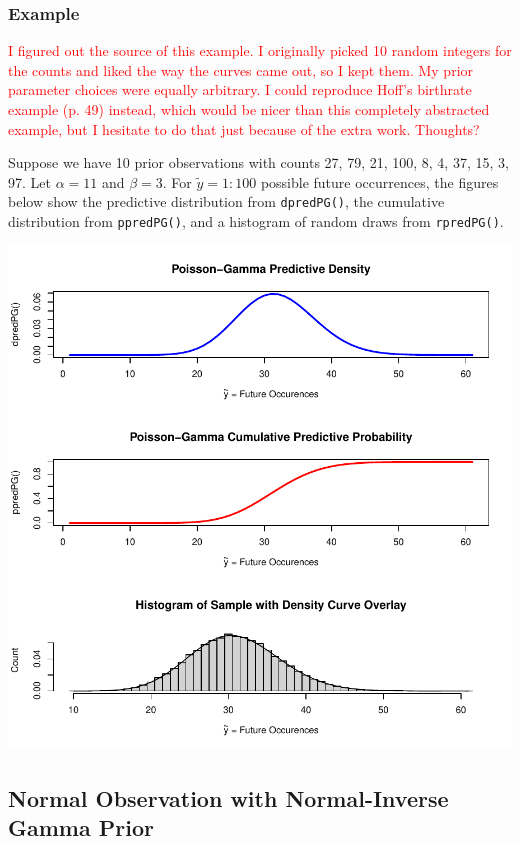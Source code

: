 \documentclass[12pt, a4paper]{article}
\begin{document}
    \subsubsection{Example}

\textcolor{red}{I figured out the source of this example.  I originally picked 10 random integers for the counts and liked the way the curves came out, so I kept them.  My prior parameter choices were equally arbitrary.  I could reproduce Hoff's birthrate example (p. 49) instead, which would be nicer than this completely abstracted example, but I hesitate to do that just because of the extra work.  Thoughts?}

Suppose we have 10 prior observations with counts 27, 79, 21, 100, 8, 4, 37, 15, 3, 97.  Let $\alpha = 11$ and $\beta = 3$.  For $\tilde{y} = 1:100$ possible future occurrences, the figures below show the predictive distribution from \texttt{dpredPG()}, the cumulative distribution from \texttt{ppredPG()}, and a histogram of random draws from \texttt{rpredPG()}.

\includegraphics{Thesis_v3-005}

\clearpage

  \subsection{Normal Observation with Normal-Inverse Gamma Prior}
\end{document}
